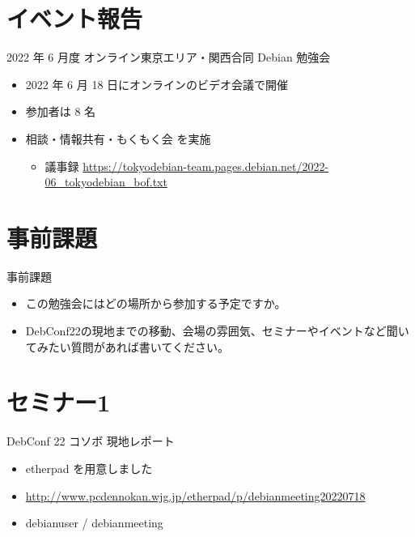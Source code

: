 \section{イベント報告}

\begin{frame}{2022 年 6 月度 オンライン東京エリア・関西合同 Debian 勉強会}
\begin{itemize}
\item 2022 年 6 月 18 日にオンラインのビデオ会議で開催
\item 参加者は 8 名
\item 相談・情報共有・もくもく会 を実施
  \begin{itemize}
  \item 議事録 \url{https://tokyodebian-team.pages.debian.net/2022-06_tokyodebian_bof.txt}
  \end{itemize}
\end{itemize}
\end{frame}


\section{事前課題}


\begin{frame}{事前課題}
  \begin{itemize}
  \item この勉強会にはどの場所から参加する予定ですか。
  \item DebConf22の現地までの移動、会場の雰囲気、セミナーやイベントなど聞いてみたい質問があれば書いてください。
  \end{itemize}
\end{frame}

{\footnotesize
 
}

%

\section{セミナー1}

\begin{frame}{DebConf 22 コソボ 現地レポート}
  \begin{itemize}
  \item etherpad を用意しました
  \item \url{http://www.pcdennokan.wjg.jp/etherpad/p/debianmeeting20220718}
  \item debianuser / debianmeeting
  \end{itemize}
\end{frame}

